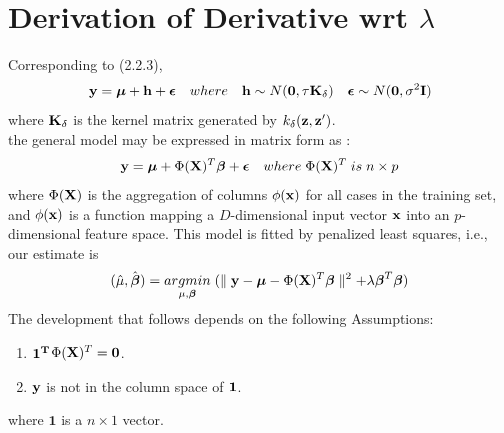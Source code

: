 \documentclass[11pt]{article}
\begin{document}
\section{{\bf Derivation of Derivative wrt $\lambda$}}
Corresponding to (2.2.3),
\begin{align*}
{\bf y}=\boldsymbol{\mu}+{\bf h}+\boldsymbol{\epsilon} \quad where \quad {\bf h} \sim N(\mathbf{0}, \tau {\bf K}_\delta) \quad \boldsymbol{\epsilon} \sim N(\mathbf{0}, \sigma^2{\bf I})
\end{align*}
where ${\bf K}_\delta$ is the kernel matrix generated by $k_{\delta}({\bf z}, {\bf z}')$.\\
the general model may be expressed in matrix form as \citep{reiss_smoothing_2009}:
\begin{align}
{\bf y}=\boldsymbol{\mu}+\Phi({\bf X})^T \boldsymbol{\beta}+\boldsymbol{\epsilon} \quad where\; \Phi({\bf X})^T \;is\; n\times p \label{2}
\end{align}
where $\Phi({\bf X})$ is the aggregation of columns $\phi({\bf x})$ for all cases in the training set, and $\phi({\bf x})$ is a function mapping a $D$-dimensional input vector ${\bf x}$ into an $p$-dimensional feature space. This model is fitted by penalized least squares, i.e., our estimate is
\begin{align}
(\hat{\mu}, \hat{\boldsymbol{\beta}})=\underset{\mu, \boldsymbol{\beta}}{argmin} \; (\parallel {\bf y}-\boldsymbol{\mu}-\Phi({\bf X})^T \boldsymbol{\beta} \parallel^2+\lambda \boldsymbol{\beta}^T\boldsymbol{\beta}) \label{3}
\end{align}
The development that follows depends on the following Assumptions:
\begin{enumerate}[1.]
\item $\bf{1}^T$$\Phi({\bf X})^T=\mathbf{0}$.
\item ${\bf y}$ is not in the column space of $\bf{1}$.
\end{enumerate}
where $\mathbf{1}$ is a $n\times 1$ vector.
\end{document}
